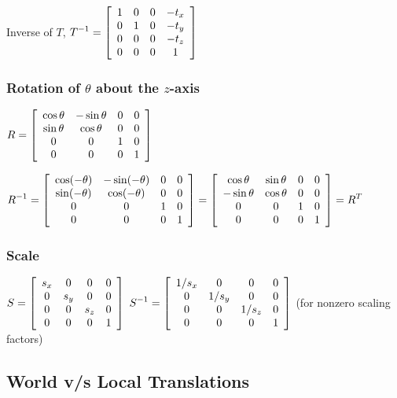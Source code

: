 \vskip 24pt

Inverse of $T$, 
$\displaystyle
T^{-1} = 
\left[
\begin{array}{cccc}
	1 & 0 & 0 & -t_x \cr
	0 & 1 & 0 & -t_y \cr
	0 & 0 & 0 & -t_z \cr
	0 & 0 & 0 & 1 \cr
\end{array}
\right] 
$

\subsubsection{Rotation of $\theta$ about the $z$-axis}

$\displaystyle
R = \left[
\begin{array}{cccc}
	\cos \theta & -\sin \theta & 0 & 0 \cr
	\sin \theta & \cos \theta & 0 & 0 \cr
	0 & 0 & 1 & 0 \cr
	0 & 0 & 0 & 1 \cr
\end{array}
\right] 
$

\vskip 24pt


$\displaystyle
R^{-1} = \left[
\begin{array}{cccc}
	\cos (-\theta) & -\sin (-\theta) & 0 & 0 \cr
	\sin (-\theta) & \cos (-\theta) & 0 & 0 \cr
	0 & 0 & 1 & 0 \cr
	0 & 0 & 0 & 1 \cr
\end{array}
\right] 
= 
\left[
\begin{array}{cccc}
	\cos \theta & \sin \theta & 0 & 0 \cr
	-\sin \theta & \cos \theta & 0 & 0 \cr
	0 & 0 & 1 & 0 \cr
	0 & 0 & 0 & 1 \cr
\end{array}
\right] 
= R^T
$

\subsubsection{Scale}

$\displaystyle
S = 
\left[
\begin{array}{cccc}
	s_x & 0 & 0 & 0 \cr
	0 & s_y & 0 & 0 \cr
	0 & 0 &  s_z &	0 \cr
	0 & 0 & 0 & 1 \cr
\end{array}
\right] 
$
\qquad
$\displaystyle
S^{-1} = 
\left[
\begin{array}{cccc}
	1/s_x & 0 & 0 & 0 \cr
	0 & 1/s_y & 0 & 0 \cr
	0 & 0 &  1/s_z &	0 \cr
	0 & 0 & 0 & 1 \cr	
\end{array}
\right] 
$
\quad (for nonzero scaling factors)

\subsection{World v/s Local Translations}

